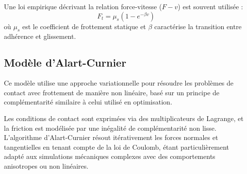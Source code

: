 Une loi empirique décrivant la relation force-vitesse (\(F - v\)) est souvent utilisée :
\begin{equation}
F_t = \mu_s (1 - e^{-\beta v}) \label{eq:stick_slip}
\end{equation}
où \(\mu_s\) est le coefficient de frottement statique et \(\beta\) caractérise la transition entre adhérence et glissement.

\subsection{Modèle d’Alart-Curnier}
Ce modèle utilise une approche variationnelle pour résoudre les problèmes de contact avec frottement de manière non linéaire, basé sur un principe de complémentarité similaire à celui utilisé en optimisation.

Les conditions de contact sont exprimées via des multiplicateurs de Lagrange, et la friction est modélisée par une inégalité de complémentarité non lisse. L’algorithme d’Alart-Curnier résout itérativement les forces normales et tangentielles en tenant compte de la loi de Coulomb, étant particulièrement adapté aux simulations mécaniques complexes avec des comportements anisotropes ou non linéaires.